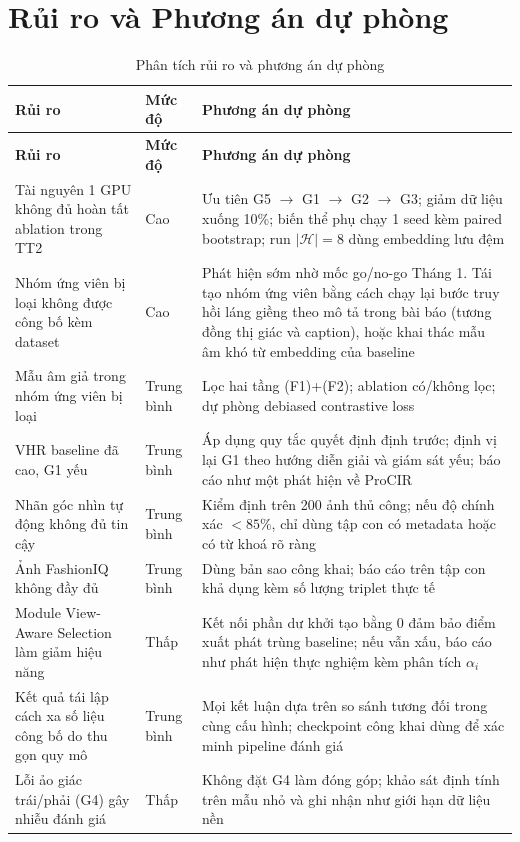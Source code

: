 \documentclass[a4paper]{article}
\begin{document}
\section{Rủi ro và Phương án dự phòng}

\begin{longtable}{L{5cm}L{1.6cm}L{8.6cm}}
\caption{Phân tích rủi ro và phương án dự phòng}\label{tab:risk}\\
\toprule
\textbf{Rủi ro} & \textbf{Mức độ} & \textbf{Phương án dự phòng}\\
\midrule\endfirsthead
\toprule
\textbf{Rủi ro} & \textbf{Mức độ} & \textbf{Phương án dự phòng}\\
\midrule\endhead
Tài nguyên 1 GPU không đủ hoàn tất ablation trong TT2 & Cao & Ưu tiên G5 $\rightarrow$ G1 $\rightarrow$ G2 $\rightarrow$ G3; giảm dữ liệu xuống 10\%; biến thể phụ chạy 1 seed kèm paired bootstrap; run $|\mathcal{H}|=8$ dùng embedding lưu đệm\\
Nhóm ứng viên bị loại không được công bố kèm dataset & Cao & Phát hiện sớm nhờ mốc go/no-go Tháng 1. Tái tạo nhóm ứng viên bằng cách chạy lại bước truy hồi láng giềng theo mô tả trong bài báo (tương đồng thị giác và caption), hoặc khai thác mẫu âm khó từ embedding của baseline\\
Mẫu âm giả trong nhóm ứng viên bị loại & Trung bình & Lọc hai tầng (F1)+(F2); ablation có/không lọc; dự phòng debiased contrastive loss\\
VHR baseline đã cao, G1 yếu & Trung bình & Áp dụng quy tắc quyết định định trước; định vị lại G1 theo hướng diễn giải và giám sát yếu; báo cáo như một phát hiện về ProCIR\\
Nhãn góc nhìn tự động không đủ tin cậy & Trung bình & Kiểm định trên 200 ảnh thủ công; nếu độ chính xác $<85\%$, chỉ dùng tập con có metadata hoặc có từ khoá rõ ràng\\
Ảnh FashionIQ không đầy đủ & Trung bình & Dùng bản sao công khai; báo cáo trên tập con khả dụng kèm số lượng triplet thực tế\\
Module View-Aware Selection làm giảm hiệu năng & Thấp & Kết nối phần dư khởi tạo bằng 0 đảm bảo điểm xuất phát trùng baseline; nếu vẫn xấu, báo cáo như phát hiện thực nghiệm kèm phân tích $\alpha_i$\\
Kết quả tái lập cách xa số liệu công bố do thu gọn quy mô & Trung bình & Mọi kết luận dựa trên so sánh tương đối trong cùng cấu hình; checkpoint công khai dùng để xác minh pipeline đánh giá\\
Lỗi ảo giác trái/phải (G4) gây nhiễu đánh giá & Thấp & Không đặt G4 làm đóng góp; khảo sát định tính trên mẫu nhỏ và ghi nhận như giới hạn dữ liệu nền\\
\bottomrule
\end{longtable}
\end{document}
